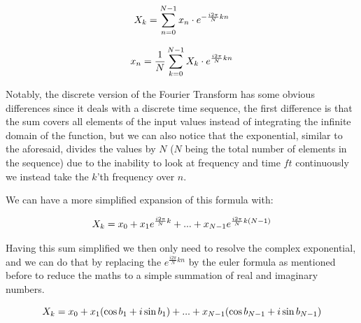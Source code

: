 \documentclass[
  oneside,
  11pt, a4paper,
  footinclude=true,
  headinclude=true,
  cleardoublepage=empty
]{scrbook}
\newcommand{\eqname}[1]{\tag*{#1}}%
\begin{document}
\begin{equation} \label{eq3}
    X_{k} = \sum_{n=0}^{N-1}x_{n} \cdot e^{- \frac{i 2 \pi}{N}kn} \\ %
\end{equation}

\begin{equation} \label{eq4}
    x_{n} = \frac{1}{N} \sum_{k=0}^{N-1}X_{k} \cdot e^{\frac{i 2 \pi}{N}kn} \\ %
\end{equation}

Notably, the discrete version of the Fourier Transform has some obvious differences since it deals with a discrete time sequence, the first difference is that the sum covers all elements of the input values instead of integrating the infinite domain of the function, but we can also notice that the exponential, similar to the aforesaid, divides the values by \(N\) (\(N\) being the total number of elements in the sequence) due to the inability to look at frequency and time \(ft\) continuously we instead take the \(k\)'th frequency over \(n\).

We can have a more simplified expansion of this formula with:

\begin{equation*}
    X_{k} = x_{0} + x_{1}e^{\frac{i 2 \pi}{N}k} + ... + x_{N-1}e^{\frac{i 2 \pi}{N}k(N-1)} \\
\end{equation*}

Having this sum simplified we then only need to resolve the complex exponential, and we can do that by replacing the \(e^{\frac{i 2 \pi}{N}kn}\) by the euler formula as mentioned before to reduce the maths to a simple summation of real and imaginary numbers.

\begin{equation} \label{dft_reduction}
    X_{k} = x_{0} + x_{1} (\cos{b_{1}} + i\sin{b_{1}}) + ... + x_{N-1} (\cos{b_{N-1}} + i\sin{b_{N-1}}) \\
\end{equation}
\end{document}
